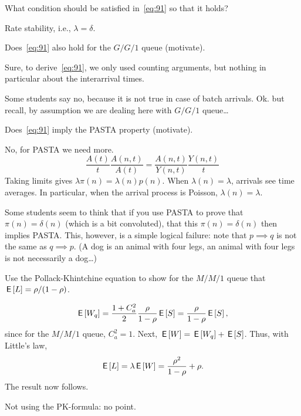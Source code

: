 \begin{exercise}[201804]
  What condition should be satisfied in~\cref{eq:91} so that it holds? 
\begin{solution}
Rate stability, i.e., $\lambda = \delta$. 
\end{solution}
\end{exercise}

\begin{exercise}[201804]
Does~\cref{eq:91} also hold for the $G/G/1$ queue (motivate).
\begin{solution}
Sure, to derive~\cref{eq:91}, we only used counting arguments, but nothing  in particular about the interarrival times. 

Some students say no, because it is not true in case of batch arrivals. Ok. but recall, by assumption we are dealing here with $G/G/1$ queue\ldots
\end{solution}
\end{exercise}

\begin{exercise}[201804]
Does~\cref{eq:91} imply the PASTA property (motivate).
\begin{solution}
No, for PASTA we need more. 
    \begin{equation*}
      \frac{A(t)}{t} \frac{A(n,t)}{A(t)}  = \frac{A(n, t)}{Y(n, t)} \frac{Y(n,t)}{t}
    \end{equation*}
Taking limits gives $\lambda \pi(n) = \lambda(n) p(n)$. When $\lambda(n)=\lambda$, arrivals see time averages. In particular, when the arrival process is Poisson, $\lambda(n)=\lambda$. 

Some students seem to think that if you use PASTA to prove that $\pi(n)=\delta(n)$ (which is a bit convoluted), that this $\pi(n)=\delta(n)$ then implies PASTA. This, however, is a simple logical failure: note that $p\implies q$ is not the same as $q\implies p$. (A dog is an animal with four legs, an animal with four legs is not necessarily a dog\ldots)
\end{solution}

\end{exercise}

\begin{exercise}[201804]
  Use the Pollack-Khintchine equation to show for the $M/M/1$ queue that $\,\mathsf{E}\left[L\right]=\rho/(1-\rho)$. 
\begin{solution}
    \begin{equation*}
    \,\mathsf{E}\left[W_q\right]= \frac{1+C_a^2}2 \frac \rho{1-\rho} \,\mathsf{E}\left[S\right] = \frac \rho{1-\rho} \,\mathsf{E}\left[S\right],
    \end{equation*}
since for the $M/M/1$ queue, $C_a^2=1$. Next, $\,\mathsf{E}\left[W\right]=\,\mathsf{E}\left[W_q\right] + \,\mathsf{E}\left[S\right]$. Thus, with Little's law, 
\begin{equation*}
\,\mathsf{E}\left[L\right] = \lambda \,\mathsf{E}\left[W\right] = \frac{\rho^2}{1-\rho} + \rho.
\end{equation*}
The result now follows.

Not using the PK-formula: no point. 
\end{solution}
\end{exercise}

